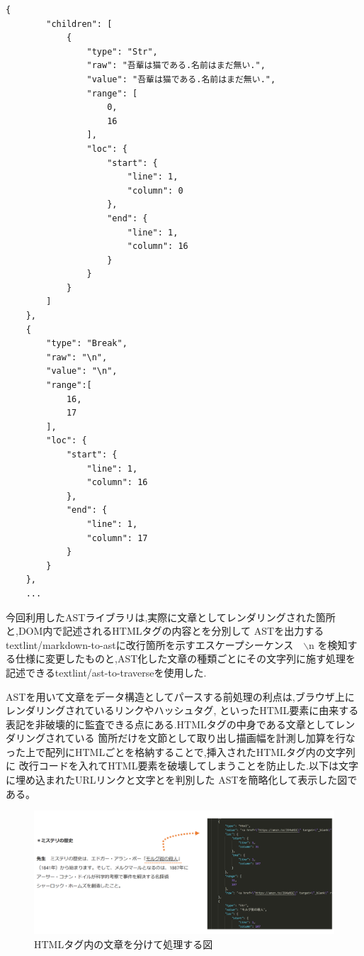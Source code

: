 \begin{lstlisting}[caption=textToAST.json]
    {
        "children": [
            {
                "type": "Str",
                "raw": "吾輩は猫である.名前はまだ無い.",
                "value": "吾輩は猫である.名前はまだ無い.",
                "range": [
                    0,
                    16
                ],
                "loc": {
                    "start": {
                        "line": 1,
                        "column": 0
                    },
                    "end": {
                        "line": 1,
                        "column": 16
                    }
                }
            }
        ]
    },
    {
        "type": "Break",
        "raw": "\n",
        "value": "\n",
        "range":[
            16,
            17
        ],
        "loc": {
            "start": {
                "line": 1,
                "column": 16
            },
            "end": {
                "line": 1,
                "column": 17
            }
        }
    },
    ...
\end{lstlisting}

今回利用したASTライブラリは,実際に文章としてレンダリングされた箇所と,DOM内で記述されるHTMLタグの内容とを分別して
ASTを出力するtextlint/markdown-to-astに改行箇所を示すエスケープシーケンス　$\backslash$n
を検知する仕様に変更したものと\footnotemark[5],AST化した文章の種類ごとにその文字列に施す処理を記述できるtextlint/ast-to-traverseを使用した.\footnotemark[6]


ASTを用いて文章をデータ構造としてパースする前処理の利点は,ブラウザ上にレンダリングされているリンクやハッシュタグ,
といったHTML要素に由来する表記を非破壊的に監査できる点にある.HTMLタグの中身である文章としてレンダリングされている
箇所だけを文節として取り出し描画幅を計測し加算を行なった上で配列にHTMLごとを格納することで,挿入されたHTMLタグ内の文字列に
改行コードを入れてHTML要素を破壊してしまうことを防止した.以下は文字に埋め込まれたURLリンクと文字とを判別した
ASTを簡略化して表示した図である。

\begin{figure}[H]
    \centering
    \label{fig:image16}
    \includegraphics[width=0.7\columnwidth]{image/03/img7.png}
	\caption[HTMLタグ内の文章を分けて処理する図]{HTMLタグ内の文章を分けて処理する図} \footnotemark[7]
\end{figure}

